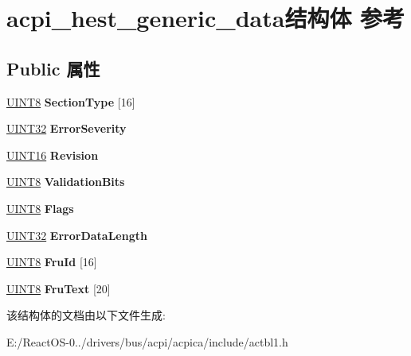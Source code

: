 \hypertarget{structacpi__hest__generic__data}{}\section{acpi\+\_\+hest\+\_\+generic\+\_\+data结构体 参考}
\label{structacpi__hest__generic__data}
\subsection*{Public 属性}
\begin{DoxyCompactItemize}
\item 
\mbox{\label{structacpi__hest__generic__data_ac90d9ffb489af5c6739200ec2658b7be}} 
\hyperlink{_processor_bind_8h_ab27e9918b538ce9d8ca692479b375b6a}{U\+I\+N\+T8} {\bfseries Section\+Type} \mbox{[}16\mbox{]}
\item 
\mbox{\label{structacpi__hest__generic__data_ae63bb3851dfa4bf7d15b4d8dfcbfd6fb}} 
\hyperlink{_processor_bind_8h_ae1e6edbbc26d6fbc71a90190d0266018}{U\+I\+N\+T32} {\bfseries Error\+Severity}
\item 
\mbox{\label{structacpi__hest__generic__data_a13ff01e44056f732e4ae714428273b3e}} 
\hyperlink{_processor_bind_8h_a09f1a1fb2293e33483cc8d44aefb1eb1}{U\+I\+N\+T16} {\bfseries Revision}
\item 
\mbox{\label{structacpi__hest__generic__data_ac1ea8da894369fa8ac1144ee876df912}} 
\hyperlink{_processor_bind_8h_ab27e9918b538ce9d8ca692479b375b6a}{U\+I\+N\+T8} {\bfseries Validation\+Bits}
\item 
\mbox{\label{structacpi__hest__generic__data_af5d86c761348846532e914abdcded0b4}} 
\hyperlink{_processor_bind_8h_ab27e9918b538ce9d8ca692479b375b6a}{U\+I\+N\+T8} {\bfseries Flags}
\item 
\mbox{\label{structacpi__hest__generic__data_af4f1ae91dc9138945122858faad6f7b8}} 
\hyperlink{_processor_bind_8h_ae1e6edbbc26d6fbc71a90190d0266018}{U\+I\+N\+T32} {\bfseries Error\+Data\+Length}
\item 
\mbox{\label{structacpi__hest__generic__data_ae4a6299798e04533df988cd8041981f6}} 
\hyperlink{_processor_bind_8h_ab27e9918b538ce9d8ca692479b375b6a}{U\+I\+N\+T8} {\bfseries Fru\+Id} \mbox{[}16\mbox{]}
\item 
\mbox{\label{structacpi__hest__generic__data_afc9799087aad0fe5db6e36d46f35a597}} 
\hyperlink{_processor_bind_8h_ab27e9918b538ce9d8ca692479b375b6a}{U\+I\+N\+T8} {\bfseries Fru\+Text} \mbox{[}20\mbox{]}
\end{DoxyCompactItemize}


该结构体的文档由以下文件生成\+:\begin{DoxyCompactItemize}
\item 
E\+:/\+React\+O\+S-\/0../drivers/bus/acpi/acpica/include/actbl1.\+h\end{DoxyCompactItemize}
